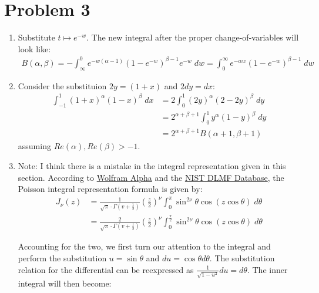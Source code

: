 \documentclass[12pt]{article}%
\begin{document}
\section{Problem 3}
\begin{enumerate}
  \item Substitute $t \mapsto e^{-w}$. The new integral after the proper change-of-variables will look like:
    \begin{align*}
        B(\alpha,\beta) = - \int_{\infty}^0 e^{-w(\alpha -1)} (1- e^{-w})^{\beta -1} e^{-w} \; dw  = \int_0^\infty e^{-\alpha w}(1 - e^{-w})^{\beta -1} \; dw
    \end{align*}
    \item
    Consider the substituion $2y = (1+x)$ and $2dy = dx$:
    \begin{align*}
          \int_{-1}^1 (1+x)^\alpha(1-x)^\beta \; dx & = 2 \int_{0}^1 (2y)^\alpha (2 - 2y)^\beta \; dy \\
          & = 2^{\alpha + \beta + 1}\int_0^1 y^\alpha (1-y)^\beta \; dy \\
          & = 2^{\alpha + \beta + 1} B(\alpha+1,\beta+1)
    \end{align*}
    assuming $Re(\alpha), Re(\beta) > -1$.

    \item
     Note: I think there is a mistake in the integral representation given in this section. According to \href{https://mathworld.wolfram.com/PoissonsBesselFunctionFormula.html}{Wolfram Alpha} and the \href{https://dlmf.nist.gov/10.9}{NIST DLMF Database}, the Poisson integral representation formula is given by:
     \begin{align*}
       J_\nu(z) & = \frac{1}{\sqrt{\pi}\cdot \Gamma(v + \frac{1}{2})} \left(\frac{z}{2}\right)^\nu \int_0^\pi \sin^{2\nu}{\theta} \cos(z \cos{\theta}) \; d\theta \\
       & = \frac{2}{\sqrt{\pi}\cdot \Gamma(v + \frac{1}{2})} \left(\frac{z}{2}\right)^\nu \int_0^{\frac{\pi}{2}} \sin^{2\nu}{\theta} \cos(z \cos{\theta}) \; d\theta
     \end{align*}

     Accounting for the two, we first turn our attention to the integral and perform the substitution $u = \sin{\theta}$ and $du = \cos{\theta} d\theta$. The substitution relation for the differential can be reexpressed as $\frac{1}{\sqrt{1 - u^2}}du = d\theta$. The inner integral will then become:


\end{enumerate}
\end{document}
